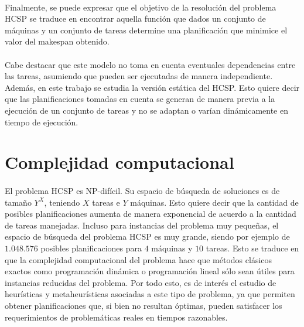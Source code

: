 \paragraph{}Finalmente, se puede expresar que el objetivo de la resolución del problema HCSP se traduce en encontrar aquella función que dados un conjunto de máquinas y un conjunto de tareas determine una planificación que minimice el valor del makespan obtenido.

\paragraph{}Cabe destacar que este modelo no toma en cuenta eventuales dependencias entre las tareas, asumiendo que pueden ser ejecutadas de manera independiente.
Además, en este trabajo se estudia la versión estática del HCSP.
Esto quiere decir que las planificaciones tomadas en cuenta se generan de manera previa a la ejecución de un conjunto de tareas y no se adaptan o varían dinámicamente en tiempo de ejecución.

\section{Complejidad computacional} \label{section:descripcion-problema,subsection:complejidad-computacional}

\paragraph{}El problema HCSP es NP-difícil.
Su espacio de búsqueda de soluciones es de tamaño $Y^X$, teniendo $X$ tareas e $Y$ máquinas.
Esto quiere decir que la cantidad de posibles planificaciones aumenta de manera exponencial de acuerdo a la cantidad de tareas manejadas.
Incluso para instancias del problema muy pequeñas, el espacio de búsqueda del problema HCSP es muy grande, siendo por ejemplo de $1.048.576$ posibles planificaciones para $4$ máquinas y $10$ tareas.
Esto se traduce en que la complejidad computacional del problema hace que métodos clásicos exactos como programación dinámica o programación lineal sólo sean útiles para instancias reducidas del problema.
Por todo esto, es de interés el estudio de heurísticas y metaheurísticas asociadas a este tipo de problema, ya que permiten obtener planificaciones que, si bien no resultan óptimas, pueden satisfacer los requerimientos de problemáticas reales en tiempos razonables.


